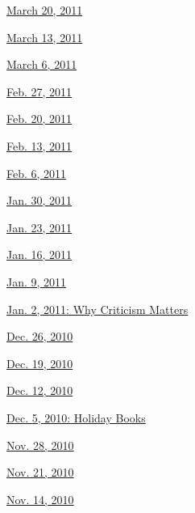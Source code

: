 \href{http://www.nytimes3xbfgragh.onion/indexes/2011/03/19/books/review/index.html}{March
20, 2011}

\href{http://www.nytimes3xbfgragh.onion/indexes/2011/03/12/books/review/index.html}{March
13, 2011}

\href{http://www.nytimes3xbfgragh.onion/indexes/2011/03/05/books/review/index.html}{March
6, 2011}

\href{http://www.nytimes3xbfgragh.onion/indexes/2011/02/26/books/review/index.html}{Feb.
27, 2011}

\href{http://www.nytimes3xbfgragh.onion/indexes/2011/02/19/books/review/index.html}{Feb.
20, 2011}

\href{http://www.nytimes3xbfgragh.onion/indexes/2011/02/12/books/review/index.html}{Feb.
13, 2011}

\href{http://www.nytimes3xbfgragh.onion/indexes/2011/02/05/books/review/index.html}{Feb.
6, 2011}

\href{http://www.nytimes3xbfgragh.onion/indexes/2011/01/29/books/review/index.html}{Jan.
30, 2011}

\href{http://www.nytimes3xbfgragh.onion/indexes/2011/01/22/books/review/index.html}{Jan.
23, 2011}

\href{http://www.nytimes3xbfgragh.onion/indexes/2011/01/15/books/review/index.html}{Jan.
16, 2011}

\href{http://www.nytimes3xbfgragh.onion/indexes/2011/01/08/books/review/index.html}{Jan.
9, 2011}

\href{http://www.nytimes3xbfgragh.onion/indexes/2011/01/01/books/review/index.html}{Jan.
2, 2011: Why Criticism Matters}

\href{http://www.nytimes3xbfgragh.onion/indexes/2010/12/25/books/review/index.html}{Dec.
26, 2010}

\href{http://www.nytimes3xbfgragh.onion/indexes/2010/12/18/books/review/index.html}{Dec.
19, 2010}

\href{http://www.nytimes3xbfgragh.onion/indexes/2010/12/11/books/review/index.html}{Dec.
12, 2010}

\href{http://www.nytimes3xbfgragh.onion/indexes/2010/12/04/books/review/index.html}{Dec.
5, 2010: Holiday Books}

\href{http://www.nytimes3xbfgragh.onion/indexes/2010/11/27/books/review/index.html}{Nov.
28, 2010}

\href{http://www.nytimes3xbfgragh.onion/indexes/2010/11/20/books/review/index.html}{Nov.
21, 2010}

\href{http://www.nytimes3xbfgragh.onion/indexes/2010/11/13/books/review/index.html}{Nov.
14, 2010}

